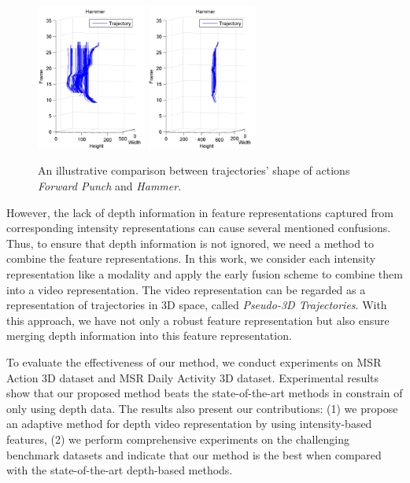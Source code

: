\documentclass[review]{elsarticle}
\begin{document}
\begin{figure}
{			\includegraphics[width=0.32\textwidth]{Hammer_SIDE.png}
			\includegraphics[width=0.32\textwidth]{Hammer_TOP.png}	
		}
		\hfill		
	\caption{An illustrative comparison between trajectories' shape of actions \textit{Forward Punch} and \textit{Hammer}.}
	\label{fig:Illustration}
\end{figure}
\fi

However, the lack of depth information in feature representations captured from corresponding intensity representations can cause several mentioned confusions. Thus, to ensure that depth information is not ignored, we need a method to combine the feature representations. In this work, we consider each intensity representation like a modality and apply the early fusion scheme to combine them into a video representation. The video representation can be regarded as a representation of trajectories in 3D space, called \textit{Pseudo-3D Trajectories}. With this approach, we have not only a robust feature representation but also ensure merging depth information into this feature representation.

To evaluate the effectiveness of our method, we conduct experiments on MSR Action 3D dataset and MSR Daily Activity 3D dataset. Experimental results show that our proposed method beats the state-of-the-art methods in constrain of only using depth data. The results also present our contributions: (1) we propose an adaptive method for depth video representation by using intensity-based features, (2) we perform comprehensive experiments on the challenging benchmark datasets and indicate that our method is the best when compared with the state-of-the-art depth-based methods.
\end{document}
